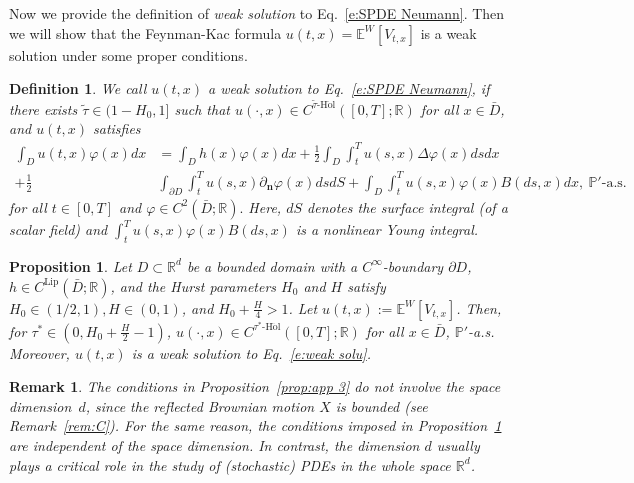 \documentclass[11pt,reqno]{amsart}
\def\R{\mathbb R}
\newtheorem{definition}{Definition}[section]
\newtheorem{remark}{Remark}[section]
\newtheorem{proposition}{Proposition}[section]
\numberwithin{equation}{section}
\begin{document}
Now we provide the definition of \emph{weak solution} to Eq.~\eqref{e:SPDE Neumann}. Then we will show that the Feynman-Kac formula $u(t,x)=\mathbb{E}^{W}\left[V_{t,x}\right]$ is a weak solution under some proper conditions.

\begin{definition}\label{def:Neumann}
We call $u(t,x)$ a \emph{weak solution} to Eq.~\eqref{e:SPDE Neumann}, if there exists  $\tilde{\tau}\in(1 - H_0 , 1]$ such that $u(\cdot,x)\in C^{\tilde{\tau}\text{-}\mathrm{H\ddot ol}}([0,T];\R)$ for all $x\in\bar{D}$,  
and $u(t,x)$ satisfies
\begin{equation}\label{e:weak solu}
\begin{aligned}
\int_{D}u(t,x) \varphi(x) dx & =  \int_{D}h(x)\varphi(x) dx + \frac{1}{2}\int_{D}\int_{t}^{T}u(s,x)\Delta \varphi(x) ds dx \\
+ \frac12 & \int_{\partial D} \int_{t}^{T} u(s,x)\partial_{\mathbf{n}}\varphi(x) ds dS   +\int_{D}\int_{t}^{T} u(s,x) \varphi(x)B(ds,x) dx, \ \mathbb{P}'\text{-a.s.}
\end{aligned}
\end{equation}
for all $t\in[0,T]$ and $\varphi\in C^{2}(\bar{D};\R).$ Here,  $dS$ denotes the surface integral (of a scalar field) and $\int_{t}^{T}u(s,x) \varphi(x) B(ds,x)$ is a nonlinear Young integral.
\end{definition}

\begin{proposition}\label{prop:Feynman-Kac for Neumann}
Let $D\subset \R^d$ be a bounded domain with a $C^{\infty}$-boundary $\partial D$, $h\in C^{\mathrm{Lip}}(\bar{D};\R)$, and the Hurst parameters $H_0$ and $H$ satisfy $H_0\in(1/2,1),H\in(0,1)$, and $H_{0}+\frac{H}{4} > 1$. Let $u(t,x):=\mathbb{E}^{W}\left[V_{t,x}\right]$. 
Then, for $\tau^*\in(0,H_{0} + \frac{H}{2} - 1)$, $u(\cdot,x)\in C^{\tau^*\text{-}\mathrm{H\ddot{o}l}}([0,T];\R)$ for all $x\in\bar{D}$, $\mathbb{P}'$-a.s. Moreover, $u(t,x)$ is a weak solution to Eq.~\eqref{e:weak solu}.
\end{proposition}

\begin{remark}
The conditions in Proposition~\ref{prop:app 3} do not involve the space dimension~$d$, since the reflected Brownian motion $X$ is bounded (see Remark~\ref{rem:C}). For the same reason, the conditions imposed in Proposition~\ref{prop:Feynman-Kac for Neumann} are independent of the  space dimension.  In contrast, the dimension $d$ usually plays a critical role in the study of (stochastic) PDEs in the whole space $\R^d$. 
\end{remark}
\end{document}
